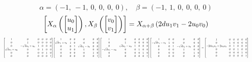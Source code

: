 \documentclass[11pt]{article}
\theoremstyle{definition}
\begin{document}
\[
\alpha = \left( -1, \  -1, \  0, \  0, \  0, \  0\right), \quad \beta = \left( -1, \  1, \  0, \  0, \  0, \  0\right)
\]
\[
\scaletoalign{\textwidth}{\left[ X_{\alpha}\left(\left[\begin{matrix}u_{0}\\u_{1}\end{matrix}\right]\right), X_{\beta}\left(\left[\begin{matrix}v_{0}\\v_{1}\end{matrix}\right]\right) \right] = X_{\alpha + \beta}\left(2 d u_{1} v_{1} - 2 u_{0} v_{0}\right)}
\]
\[
\scaletoalign{\textwidth}{{\left[\begin{matrix}1 & 0 & 0 & 0 & 0 & 0\\0 & 1 & 0 & 0 & 0 & 0\\0 & - \sqrt{d} u_{1} + u_{0} & 1 & 0 & 0 & 0\\\sqrt{d} u_{1} + u_{0} & 0 & 0 & 1 & 0 & 0\\0 & 0 & 0 & 0 & 1 & 0\\0 & 0 & 0 & 0 & 0 & 1\end{matrix}\right]} {\left[\begin{matrix}1 & 0 & 0 & 0 & 0 & 0\\\sqrt{d} v_{1} + v_{0} & 1 & 0 & 0 & 0 & 0\\0 & 0 & 1 & \sqrt{d} v_{1} - v_{0} & 0 & 0\\0 & 0 & 0 & 1 & 0 & 0\\0 & 0 & 0 & 0 & 1 & 0\\0 & 0 & 0 & 0 & 0 & 1\end{matrix}\right]} {\left[\begin{matrix}1 & 0 & 0 & 0 & 0 & 0\\0 & 1 & 0 & 0 & 0 & 0\\0 & \sqrt{d} u_{1} - u_{0} & 1 & 0 & 0 & 0\\- \sqrt{d} u_{1} - u_{0} & 0 & 0 & 1 & 0 & 0\\0 & 0 & 0 & 0 & 1 & 0\\0 & 0 & 0 & 0 & 0 & 1\end{matrix}\right]} {\left[\begin{matrix}1 & 0 & 0 & 0 & 0 & 0\\- \sqrt{d} v_{1} - v_{0} & 1 & 0 & 0 & 0 & 0\\0 & 0 & 1 & - \sqrt{d} v_{1} + v_{0} & 0 & 0\\0 & 0 & 0 & 1 & 0 & 0\\0 & 0 & 0 & 0 & 1 & 0\\0 & 0 & 0 & 0 & 0 & 1\end{matrix}\right]} = {\left[\begin{matrix}1 & 0 & 0 & 0 & 0 & 0\\0 & 1 & 0 & 0 & 0 & 0\\- 2 d u_{1} v_{1} + 2 u_{0} v_{0} & 0 & 1 & 0 & 0 & 0\\0 & 0 & 0 & 1 & 0 & 0\\0 & 0 & 0 & 0 & 1 & 0\\0 & 0 & 0 & 0 & 0 & 1\end{matrix}\right]}}
\]
\end{document}
